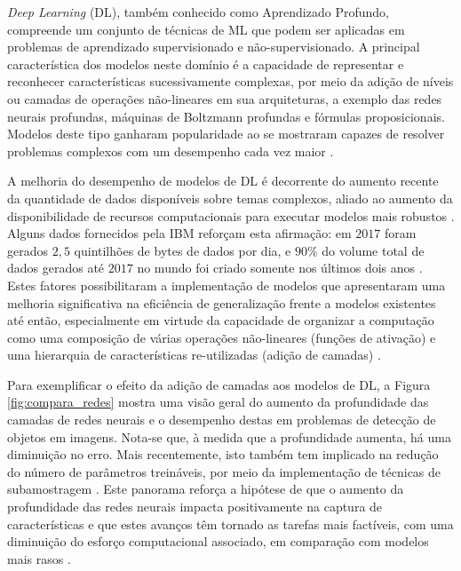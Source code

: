 
\emph{Deep Learning} (DL), também conhecido como Aprendizado Profundo, compreende um conjunto de técnicas de ML que podem ser aplicadas em problemas de aprendizado supervisionado e não-supervisionado. A principal característica dos modelos neste domínio é a capacidade de representar e reconhecer características sucessivamente complexas, por meio da adição de níveis ou camadas de operações não-lineares em sua arquiteturas, a exemplo das redes neurais profundas, máquinas de Boltzmann profundas e fórmulas proposicionais. Modelos deste tipo ganharam popularidade ao se mostraram capazes de resolver problemas complexos com um desempenho cada vez maior \cite{bengio2009learning}.

A melhoria do desempenho de modelos de DL é decorrente do aumento recente da quantidade de dados disponíveis sobre temas complexos, aliado ao aumento da disponibilidade de recursos computacionais para executar modelos mais robustos \cite{goodfellow2016deep,deng2014deep}. Alguns dados fornecidos pela IBM reforçam esta afirmação: em $2017$ foram gerados $2,5$ quintilhões de bytes de dados por dia, e $90\%$ do volume total de dados gerados até $2017$ no mundo foi criado somente nos últimos dois anos \cite{ibm2017bigdata}. Estes fatores possibilitaram a implementação de modelos que apresentaram uma melhoria significativa na eficiência de generalização frente a modelos existentes até então, especialmente em virtude da capacidade de organizar a computação como uma composição de várias operações não-lineares (funções de ativação) e uma hierarquia de características re-utilizadas (adição de camadas) \cite{goodfellow2016deep}.

Para exemplificar o efeito da adição de camadas aos modelos de DL, a Figura \ref{fig:compara_redes} mostra uma visão geral do aumento da profundidade das camadas de redes neurais e o desempenho destas em problemas de detecção de objetos em imagens. Nota-se que, à medida que a profundidade aumenta, há uma diminuição no erro. Mais recentemente, isto também tem implicado na redução do número de parâmetros treináveis, por meio da implementação de técnicas de subamostragem \cite{haykin2009neural}. Este panorama reforça a hipótese de que o aumento da profundidade das redes neurais impacta positivamente na captura de características e que estes avanços têm tornado as tarefas mais factíveis, com uma diminuição do esforço computacional associado, em comparação com modelos mais rasos \cite{goodfellow2016deep}.

